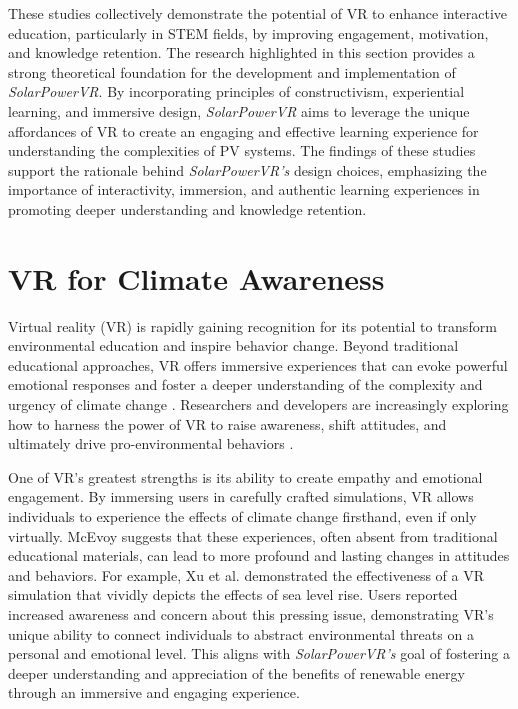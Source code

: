 \documentclass[draft, final]{vutinfth} %
\begin{document}
These studies collectively demonstrate the potential of VR to enhance interactive education, particularly in STEM fields, by improving engagement, motivation, and knowledge retention. The research highlighted in this section provides a strong theoretical foundation for the development and implementation of \textit{SolarPowerVR}. By incorporating principles of constructivism, experiential learning, and immersive design, \textit{SolarPowerVR} aims to leverage the unique affordances of VR to create an engaging and effective learning experience for understanding the complexities of PV systems. The findings of these studies support the rationale behind \textit{SolarPowerVR's} design choices, emphasizing the importance of interactivity, immersion, and authentic learning experiences in promoting deeper understanding and knowledge retention.

\section{VR for Climate Awareness}

Virtual reality (VR) is rapidly gaining recognition for its potential to transform environmental education and inspire behavior change. Beyond traditional educational approaches, VR offers immersive experiences that can evoke powerful emotional responses and foster a deeper understanding of the complexity and urgency of climate change \cite{Ball2023Effects}. Researchers and developers are increasingly exploring how to harness the power of VR to raise awareness, shift attitudes, and ultimately drive pro-environmental behaviors \cite{McEvoy2023Climate}.

One of VR's greatest strengths is its ability to create empathy and emotional engagement. By immersing users in carefully crafted simulations, VR allows individuals to experience the effects of climate change firsthand, even if only virtually. McEvoy \cite{McEvoy2023Climate} suggests that these experiences, often absent from traditional educational materials, can lead to more profound and lasting changes in attitudes and behaviors. For example, Xu et al. \cite{Xu2022Explore} demonstrated the effectiveness of a VR simulation that vividly depicts the effects of sea level rise. Users reported increased awareness and concern about this pressing issue, demonstrating VR's unique ability to connect individuals to abstract environmental threats on a personal and emotional level. This aligns with \textit{SolarPowerVR's} goal of fostering a deeper understanding and appreciation of the benefits of renewable energy through an immersive and engaging experience.
\end{document}
